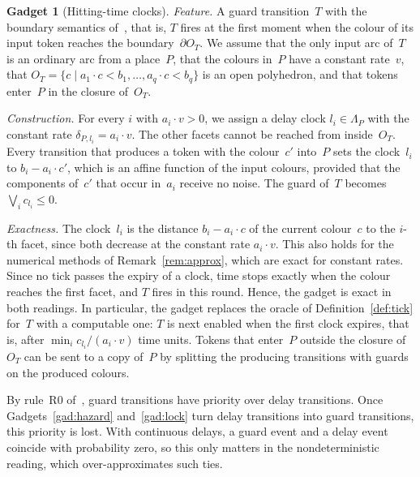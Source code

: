 \documentclass[11pt]{article}
\theoremstyle{definition}
\newtheorem{gadget}{Gadget}
\begin{document}
\begin{gadget}[Hitting-time clocks]\label{gad:hitting}
  \emph{Feature.} A guard transition~$T$ with the boundary semantics
  of~\cite{EverdijBlom2005}, that is, $T$ fires at the first moment when the
  colour of its input token reaches the boundary~$\partial O_T$. We assume
  that the only input arc of~$T$ is an ordinary arc from a place~$P$, that
  the colours in~$P$ have a constant rate~$v$, that $O_T = \{c \mid a_1
  \cdot c < b_1, \dots, a_q \cdot c < b_q\}$ is an open polyhedron, and that
  tokens enter~$P$ in the closure of~$O_T$.

  \emph{Construction.} For every $i$ with $a_i \cdot v > 0$, we assign a
  delay clock $l_i \in \Lambda_P$ with the constant rate
  $\delta_{P, l_i} = a_i \cdot v$. The other facets cannot be reached from
  inside~$O_T$. Every transition that produces a token with the colour~$c'$
  into~$P$ sets the clock~$l_i$ to $b_i - a_i \cdot c'$, which is an affine
  function of the input colours, provided that the components of~$c'$ that
  occur in~$a_i$ receive no noise. The guard of~$T$ becomes
  $\bigvee_i c_{l_i} \le 0$.

  \emph{Exactness.} The clock~$l_i$ is the distance $b_i - a_i \cdot c$ of the
  current colour~$c$ to the $i$-th facet, since both decrease at the
  constant rate $a_i \cdot v$. This also holds for the numerical methods of
  Remark~\ref{rem:approx}, which are exact for constant rates. Since no
  tick passes the expiry of a clock, time stops exactly when the colour
  reaches the first facet, and $T$ fires in this round. Hence, the gadget is
  exact in both readings. In particular, the gadget replaces the oracle of
  Definition~\ref{def:tick} for~$T$ with a computable one: $T$ is next
  enabled when the first clock expires, that is, after
  $\min_i c_{l_i} / (a_i \cdot v)$ time units. Tokens that enter~$P$ outside
  the closure
  of~$O_T$ can be sent to a copy of~$P$ by splitting the producing
  transitions with guards on the produced colours.

  By rule~R0 of~\cite{EverdijBlom2005}, guard transitions have priority over
  delay transitions. Once Gadgets~\ref{gad:hazard} and~\ref{gad:lock} turn
  delay transitions into guard transitions, this priority is lost. With
  continuous delays, a guard event and a delay event coincide with
  probability zero, so this only matters in the nondeterministic reading,
  which over-approximates such ties.
\end{gadget}
\end{document}
